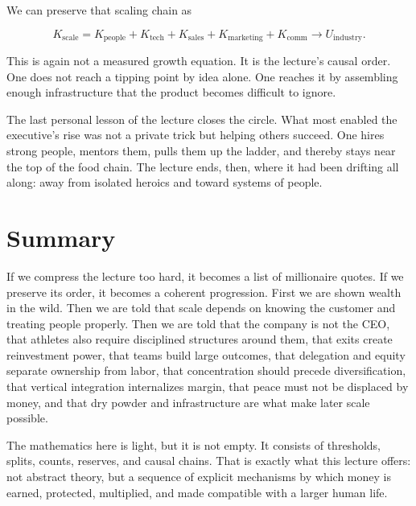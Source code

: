 We can preserve that scaling chain as

\begin{equation}
K_{\mathrm{scale}}
=
K_{\mathrm{people}}
+
K_{\mathrm{tech}}
+
K_{\mathrm{sales}}
+
K_{\mathrm{marketing}}
+
K_{\mathrm{comm}}
\longrightarrow
U_{\mathrm{industry}}.
\end{equation}

This is again not a measured growth equation. It is the lecture's causal order. One does not reach a tipping point by idea alone. One reaches it by assembling enough infrastructure that the product becomes difficult to ignore.

The last personal lesson of the lecture closes the circle. What most enabled the executive's rise was not a private trick but helping others succeed. One hires strong people, mentors them, pulls them up the ladder, and thereby stays near the top of the food chain. The lecture ends, then, where it had been drifting all along: away from isolated heroics and toward systems of people.

\section{Summary}

If we compress the lecture too hard, it becomes a list of millionaire quotes. If we preserve its order, it becomes a coherent progression. First we are shown wealth in the wild. Then we are told that scale depends on knowing the customer and treating people properly. Then we are told that the company is not the CEO, that athletes also require disciplined structures around them, that exits create reinvestment power, that teams build large outcomes, that delegation and equity separate ownership from labor, that concentration should precede diversification, that vertical integration internalizes margin, that peace must not be displaced by money, and that dry powder and infrastructure are what make later scale possible.

The mathematics here is light, but it is not empty. It consists of thresholds, splits, counts, reserves, and causal chains. That is exactly what this lecture offers: not abstract theory, but a sequence of explicit mechanisms by which money is earned, protected, multiplied, and made compatible with a larger human life.